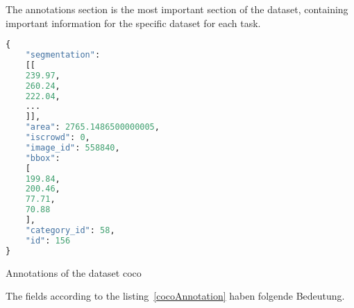 \bigskip

The annotations section is the most important section of the dataset, containing important information for the specific dataset for each task.

\begin{code}
    \begin{lstlisting}[language=python]
{
    "segmentation":
    [[
    239.97,
    260.24,
    222.04,
    ...
    ]],
    "area": 2765.1486500000005,
    "iscrowd": 0,
    "image_id": 558840,
    "bbox":
    [
    199.84,
    200.46,
    77.71,
    70.88
    ],
    "category_id": 58,
    "id": 156
}
\end{lstlisting}
\caption{Annotations of the dataset \ac{coco}}\label{cocoAnnotation}
\end{code}

The fields according to the listing~\ref{cocoAnnotation} haben folgende Bedeutung.

